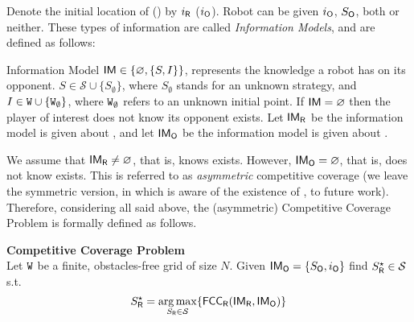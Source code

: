 Denote the initial location of  \rob (\opp) by $i_{{{\sf R}}}$ ($i_{{{\sf O}}}$). %
Robot \rob can be given $i_{{\sf O}}$, $S_{{\sf O}}$, both or neither. These types of information are called {\em Information Models}, and are defined as follows:
\begin{definition}
Information Model ${{\sf{IM}}} \in \lbrace \varnothing, \lbrace S,I\rbrace \rbrace$, represents the knowledge a robot has on its opponent. $S\in \mathcal{S} \cup \lbrace S_\emptyset \rbrace$, where $S_\emptyset$ stands for an unknown strategy, and $I \in {{\texttt W}} \cup \lbrace {{\texttt W}}_\emptyset \rbrace$, where ${{\texttt W}}_{\emptyset}$ refers to an unknown initial point. 
If ${{\sf{IM}}}=\varnothing$ then the player of interest does not know its opponent exists.
Let ${{\sf{IM}}}_{{\sf R}}$ be the information model \rob is given about \opp, and let ${{\sf{IM}}}_{{\sf O}}$ be the information model \opp is given about \rob.
\end{definition}

We assume that ${{\sf{IM}}}_{{{\sf R}}} \neq \varnothing$, that is, \rob knows \opp exists. However, ${{\sf{IM}}}_{{\sf O}}=\varnothing$, that is, \opp does not know \rob exists. This is referred to as {\em asymmetric} competitive coverage (we leave the symmetric version, in which \opp is aware of the existence of \rob, to future work). 
Therefore, considering all said above, the (asymmetric) Competitive Coverage Problem is formally defined as follows.%

\begin{tcolorbox}[boxsep=1pt,left=2pt,right=2pt,top=0pt,bottom=0pt]
\textbf{Competitive Coverage Problem}\\
Let ${{\texttt W}}$ be a finite, obstacles-free grid of size $N$. Given ${{\sf{IM}}}_{{\sf O}}=\lbrace S_{{\sf O}} ,i_{{\sf O}} \rbrace$ %
find $S_{{\sf R}}^\star \in \mathcal{S}$ s.t.
\begin{dmath*}[compact]
S_\rob^\star =\argmax_{S_\rob\in\mathcal{S}} \lbrace \fcc_{\rob}(\IM_\rob,\IM_\opp ) \rbrace
\end{dmath*}
\end{tcolorbox}
